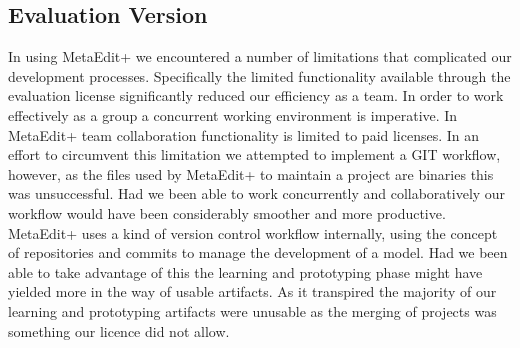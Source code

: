 \documentclass[12pt]{article}
\begin{document}
\subsection{Evaluation Version}
In using MetaEdit+ we encountered a number of limitations that complicated our development processes. Specifically the limited functionality available through the evaluation license significantly reduced our efficiency as a team. In order to work effectively as a group a concurrent working environment is imperative. In MetaEdit+ team collaboration functionality is limited to paid licenses. In an effort to circumvent this limitation we attempted to implement a GIT workflow, however, as the files used by MetaEdit+ to maintain a project are binaries this was unsuccessful. Had we been able to work concurrently and collaboratively our workflow would have been considerably smoother and more productive. MetaEdit+ uses a kind of version control workflow internally, using the concept of repositories and commits to manage the development of a model. Had we been able to take advantage of this the learning and prototyping phase might have yielded more in the way of usable artifacts. As it transpired the majority of our learning and prototyping artifacts were unusable as the merging of projects was something our licence did not allow.




\end{document}
